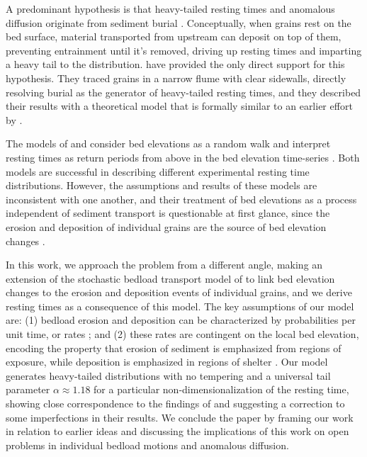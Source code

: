 \documentclass[draft]{agujournal2018}
\begin{document}
A predominant hypothesis is that heavy-tailed resting times and anomalous diffusion originate from sediment burial \citep{Voepel2013,Martin2014,Wu2019}.
Conceptually, when grains rest on the bed surface, material transported from upstream can deposit on top of them, preventing entrainment until it's removed, driving up resting times and imparting a heavy tail to the distribution.
\citet{Martin2014} have provided the only direct support for this hypothesis.
They traced grains in a narrow flume with clear sidewalls, directly resolving burial as the generator of heavy-tailed resting times, and they described their results with a theoretical model that is formally similar to an earlier effort by \citet{Voepel2013}.

The models of \citet{Voepel2013} and \citet{Martin2014} consider bed elevations as a random walk and interpret resting times as return periods from above in the bed elevation time-series \citep[e.g.][]{Redner2007}.
Both models are successful in describing different experimental resting time distributions.
However, the assumptions and results of these models are inconsistent with one another, and their treatment of bed elevations as a process independent of sediment transport is questionable at first glance, since the erosion and deposition of individual grains are the source of bed elevation changes \citep[e.g.][]{Wong2007}.

In this work, we approach the problem from a different angle, making an extension of the stochastic bedload transport model of \citet{Ancey2008} to link bed elevation changes to the erosion and deposition events of individual grains, and we derive resting times as a consequence of this model.
The key assumptions of our model are: (1) bedload erosion and deposition can be characterized by probabilities per unit time, or rates \citep[e.g.][]{Einstein1950, Ancey2008}; and (2) these rates are contingent on the local bed elevation, encoding the property that erosion of sediment is emphasized from regions of exposure, while deposition is emphasized in regions of shelter \citep[e.g.][]{Sawai1987, Wong2007}.
Our model generates heavy-tailed distributions with no tempering and a universal tail parameter $\alpha \approx 1.18$ for a particular non-dimensionalization of the resting time, showing close correspondence to the findings of \citet{Martin2014} and suggesting a correction to some imperfections in their results.
We conclude the paper by framing our work in relation to earlier ideas and discussing the implications of this work on open problems in individual bedload motions and anomalous diffusion.
\end{document}
